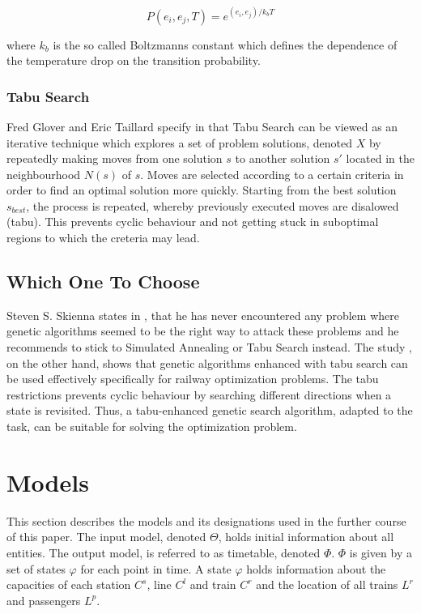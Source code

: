 \documentclass[a4paper,12pt,parskip]{article}
\begin{document}
$$
P(e_i, e_j, T) = e^{(e_i, e_j)/k_bT}
$$

where $k_b$ is the so called Boltzmanns constant which defines the dependence of 
the temperature drop on the transition probability.

\subsubsection{Tabu Search}
\label{sec:tabu}

Fred Glover and Eric Taillard specify in \cite{glover1993} that Tabu Search can 
be viewed as an iterative technique which explores a set of problem solutions,
denoted $X$ by repeatedly making moves from one solution $s$ to another solution 
$s'$ located in the neighbourhood $N(s)$ of $s$. Moves are selected according to 
a certain criteria in order to find an optimal solution more quickly. Starting from 
the best solution $s_{best}$, the process is repeated, whereby previously executed 
moves are disalowed (tabu). This prevents cyclic behaviour and not getting stuck 
in suboptimal regions to which the creteria may lead.

\subsection{Which One To Choose}

Steven S. Skienna states in \cite{skienna08}, that he has never encountered any 
problem where genetic algorithms seemed to be the right way to attack these 
problems and he recommends to stick to Simulated Annealing or Tabu Search instead. 
The study \cite{FrancisGorman1998}, on the other hand, shows that genetic 
algorithms enhanced with tabu search can be used effectively specifically for 
railway optimization problems. The tabu restrictions prevents cyclic behaviour by 
searching different directions when a state is revisited. Thus, a tabu-enhanced 
genetic search algorithm, adapted to the task, can be suitable for solving the 
optimization problem.

\section{Models}

This section describes the models and its designations used in the further course 
of this paper. The input model, denoted $\Theta$, holds initial information about 
all entities. The output model, is referred to as timetable, denoted $\Phi$. $\Phi$ 
is given by a set of states $\varphi$ for each point in time. A state $\varphi$ 
holds information about the capacities of each station $C^s$, line $C^l$ and train 
$C^r$ and the location of all trains $L^r$ and passengers $L^p$. 
\end{document}
